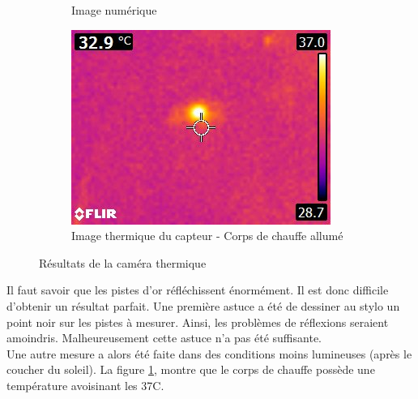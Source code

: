 \begin{figure}[H]
\begin{subfigure}[b]{0.3\textwidth}
        \caption{Image numérique}
    \end{subfigure}
    \begin{subfigure}[b]{0.4\textwidth}
        \includegraphics[scale = 0.5]{assets/figures/thermique_avec_chauffe.jpg}
        \caption{Image thermique du capteur - Corps de chauffe allumé}
    \end{subfigure}
    \caption{Résultats de la caméra thermique}
    \label{fig:cameraThermique}
\end{figure}

Il faut savoir que les pistes d'or réfléchissent énormément. Il est donc difficile d'obtenir un résultat parfait. Une première astuce a été de
dessiner au stylo un point noir sur les pistes à mesurer. Ainsi, les problèmes de réflexions seraient amoindris. Malheureusement cette astuce n'a
pas été suffisante. \\

Une autre mesure a alors été faite dans des conditions moins lumineuses (après le coucher du soleil). La figure \ref*{fig:cameraThermique},
montre que le corps de chauffe possède une température avoisinant les 37\textdegree C. \\

